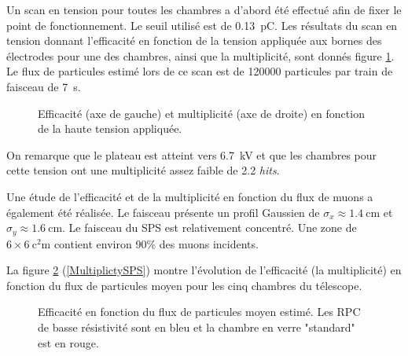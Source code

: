 Un scan en tension pour toutes les chambres a d'abord été effectué afin de fixer le point de fonctionnement. Le seuil utilisé est de \SI{0.13}{\pico\coulomb}. Les résultats du scan en tension donnant l’efficacité en fonction de la tension appliquée aux bornes des électrodes pour une des chambres, ainsi que la multiplicité, sont donnés figure \ref{HVSPS}. Le flux de particules estimé lors de ce scan est de \num{120000} particules par train de faisceau de \SI{7}{\second}.

\begin{figure}[!ht]
	\centering
	\caption{Efficacité (axe de gauche) et multiplicité (axe de droite) en fonction de la haute tension appliquée.}
	\label{HVSPS}
\end{figure}

On remarque que le plateau est atteint vers \SI{6.7}{\kilo\volt} et que les chambres pour cette tension ont une multiplicité assez faible de \num{2.2} \textit{hits}. 

Une étude de l'efficacité et de la multiplicité en fonction du flux de muons a également été réalisée. Le faisceau présente un profil Gaussien de $\sigma_{x}\approx\SI{1.4}{\centi\meter}$ et $\sigma_{y}\approx\SI{1.6}{\centi\meter}$. Le faisceau du SPS est relativement concentré. Une zone de $\num{6}\times\SI{6}{\square\centi\meter}$ contient environ \num{90}\% des muons incidents.

La figure \ref{RateSPS} (\ref{MultiplictySPS}) montre l'évolution de l'efficacité (la multiplicité) en fonction du flux de particules moyen pour les cinq chambres du télescope.

\begin{figure}[!ht]
	\centering
	\caption{Efficacité en fonction du flux de particules moyen estimé. Les RPC de basse résistivité sont en bleu et la chambre en verre "standard" est en rouge.}
	\label{RateSPS}
\end{figure}

\newpage

